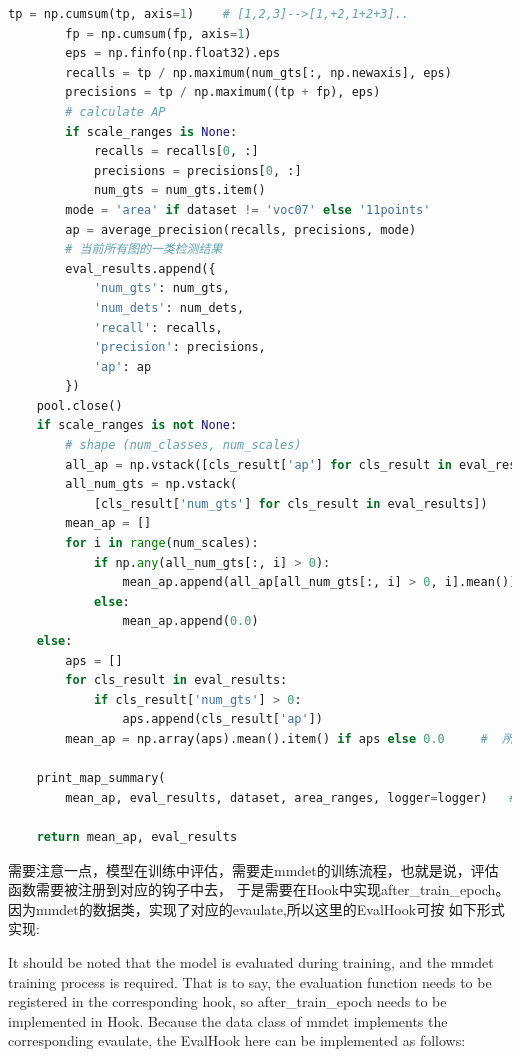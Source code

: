 \documentclass[UTF8]{ctexart}
\begin{document}
\begin{lstlisting}[language=Python]
        tp = np.cumsum(tp, axis=1)    # [1,2,3]-->[1,+2,1+2+3]..
        fp = np.cumsum(fp, axis=1)
        eps = np.finfo(np.float32).eps
        recalls = tp / np.maximum(num_gts[:, np.newaxis], eps)
        precisions = tp / np.maximum((tp + fp), eps)
        # calculate AP
        if scale_ranges is None:
            recalls = recalls[0, :]
            precisions = precisions[0, :]
            num_gts = num_gts.item()
        mode = 'area' if dataset != 'voc07' else '11points'
        ap = average_precision(recalls, precisions, mode)
        # 当前所有图的一类检测结果
        eval_results.append({
            'num_gts': num_gts,
            'num_dets': num_dets,
            'recall': recalls,
            'precision': precisions,
            'ap': ap
        })
    pool.close()
    if scale_ranges is not None:
        # shape (num_classes, num_scales)
        all_ap = np.vstack([cls_result['ap'] for cls_result in eval_results])
        all_num_gts = np.vstack(
            [cls_result['num_gts'] for cls_result in eval_results])
        mean_ap = []
        for i in range(num_scales):
            if np.any(all_num_gts[:, i] > 0):
                mean_ap.append(all_ap[all_num_gts[:, i] > 0, i].mean())
            else:
                mean_ap.append(0.0)
    else:
        aps = []
        for cls_result in eval_results:
            if cls_result['num_gts'] > 0:
                aps.append(cls_result['ap'])
        mean_ap = np.array(aps).mean().item() if aps else 0.0　　　#  所有类的平均ap-->mAP

    print_map_summary(
        mean_ap, eval_results, dataset, area_ranges, logger=logger)   # 好看的打印

    return mean_ap, eval_results

\end{lstlisting}


需要注意一点，模型在训练中评估，需要走mmdet的训练流程，也就是说，评估函数需要被注册到对应的钩子中去，
于是需要在Hook中实现after\_train\_epoch。因为mmdet的数据类，实现了对应的evaulate,所以这里的EvalHook可按
如下形式实现:

It should be noted that the model is evaluated during training, and the mmdet training process is 
required. That is to say, the evaluation function needs to be registered in the corresponding hook, 
so after\_train\_epoch needs to be implemented in Hook. Because the data class of mmdet implements 
the corresponding evaulate, the EvalHook here can be implemented as follows:
\end{document}
